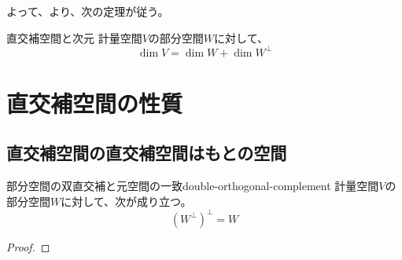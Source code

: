 \documentclass[../../../topic_linear-algebra]{subfiles}
\begin{document}
よって、より、次の定理が従う。

\begin{theorem*}{直交補空間と次元}
  計量空間$V$の部分空間$W$に対して、
  \begin{equation*}
    \dim V = \dim W + \dim W^\perp
  \end{equation*}
\end{theorem*}

\sectionline
\section{直交補空間の性質}

\subsection{直交補空間の直交補空間はもとの空間}

\begin{theorem}{部分空間の双直交補と元空間の一致}{double-orthogonal-complement}
  計量空間$V$の部分空間$W$に対して、次が成り立つ。
  \begin{equation*}
    (W^\perp)^\perp = W
  \end{equation*}
\end{theorem}

\begin{proof}
  \todo{}
\end{proof}
\end{document}
